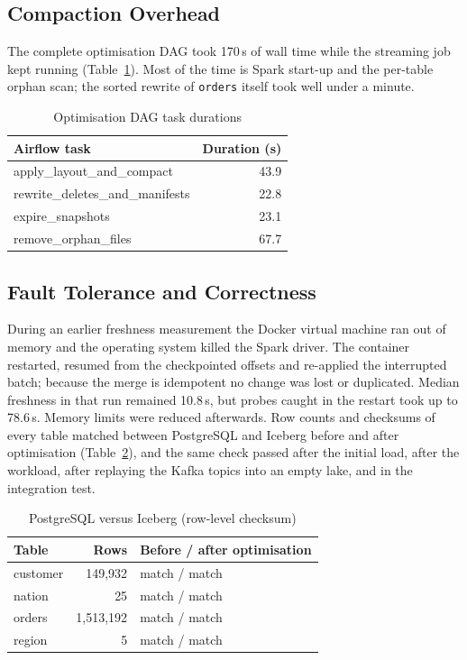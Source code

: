 \documentclass[conference,a4paper]{IEEEtran}
\newcommand{\code}[1]{\texttt{#1}}
\begin{document}
\subsection{Compaction Overhead}
The complete optimisation DAG took 170\,s of wall time while the streaming job kept running
(Table~\ref{tab:tasks}). Most of the time is Spark start-up and the per-table orphan scan; the sorted rewrite of
\code{orders} itself took well under a minute.

\begin{table}[t]
\caption{Optimisation DAG task durations}
\label{tab:tasks}
\centering
\footnotesize
\begin{tabular}{@{}lr@{}}
\toprule
Airflow task & Duration (s) \\
\midrule
apply\_layout\_and\_compact & 43.9 \\
rewrite\_deletes\_and\_manifests & 22.8 \\
expire\_snapshots & 23.1 \\
remove\_orphan\_files & 67.7 \\
\bottomrule
\end{tabular}
\end{table}

\subsection{Fault Tolerance and Correctness}
During an earlier freshness measurement the Docker virtual machine ran out of memory and the operating system killed
the Spark driver. The container restarted, resumed from the checkpointed offsets and re-applied the interrupted
batch; because the merge is idempotent no change was lost or duplicated. Median freshness in that run remained
10.8\,s, but probes caught in the restart took up to 78.6\,s. Memory limits were reduced afterwards. Row
counts and checksums of every table matched between PostgreSQL and Iceberg before and after optimisation
(Table~\ref{tab:cons}), and the same check passed after the initial load, after the workload, after replaying the
Kafka topics into an empty lake, and in the integration test.

\begin{table}[t]
\caption{PostgreSQL versus Iceberg (row-level checksum)}
\label{tab:cons}
\centering
\footnotesize
\begin{tabular}{@{}lrl@{}}
\toprule
Table & Rows & Before / after optimisation \\
\midrule
customer & 149,932 & match / match \\
nation & 25 & match / match \\
orders & 1,513,192 & match / match \\
region & 5 & match / match \\
\bottomrule
\end{tabular}
\end{table}
\end{document}
